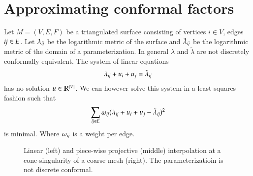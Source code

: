 \documentclass[Thesis.tex]{subfiles}
\begin{document}
\section{Approximating conformal factors}

Let $M=(V, E, F)$ be a triangulated surface consisting of vertices $i\in V$, edges $\it{ij}\in E$. 
Let $\lambda_{\it{ij}}$ be the logarithmic metric of the surface and $\tilde{\lambda}_{\it{ij}}$
be the logarithmic metric of the domain of a parameterization. In general $\lambda$ and 
$\tilde{\lambda}$ are not discretely conformally equivalent. The system of linear equations
\begin{equation}
	\lambda_{\it{ij}} + u_i + u_j = \tilde{\lambda}_{\it{ij}}
\end{equation}
has no solution $u\in \mathbb R^{|V|}$. 
We can however solve this system in a least squares fashion such that 
\[\sum_{\it{ij} \in E} \omega_{\it{ij}}(\lambda_{\it{ij}} + u_i + u_j - \tilde{\lambda}_{\it{ij}})^2 \]
is minimal. Where $\omega_{\it{ij}}$ is a weight per edge.

\begin{figure}
\centering
{}
\caption[Linear and projective interpolation at a cone-like singularity]
{Linear (left) and piece-wise projective (middle) interpolation 
at a cone-singularity of a coarse mesh (right). The parameterizatioin is not discrete conformal.}
\label{fig:linear_projective} 
\end{figure}

\subfilebibliography
\end{document}
